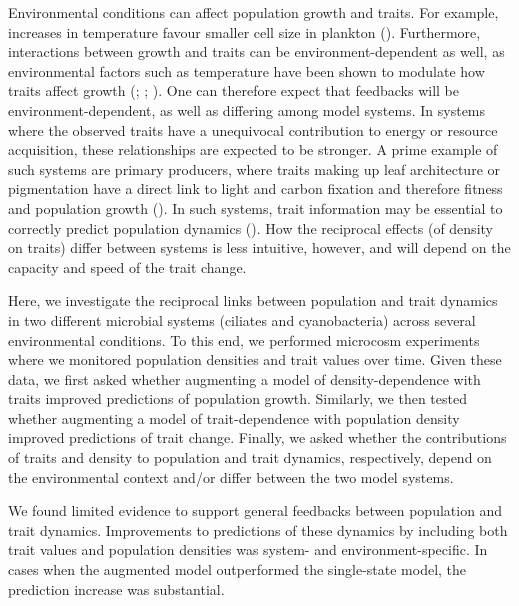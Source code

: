 \documentclass[
  letterpaper,
  DIV=11,
  numbers=noendperiod]{scrartcl}
\begin{document}
Environmental conditions can affect population growth and traits. For
example, increases in temperature favour smaller cell size in plankton
(). Furthermore, interactions between growth and traits can be
environment-dependent as well, as environmental factors such as
temperature have been shown to modulate how traits affect growth
(;
;
). One can
therefore expect that feedbacks will be environment-dependent, as well
as differing among model systems. In systems where the observed traits
have a unequivocal contribution to energy or resource acquisition, these
relationships are expected to be stronger. A prime example of such
systems are primary producers, where traits making up leaf architecture
or pigmentation have a direct link to light and carbon fixation and
therefore fitness and population growth (). In such systems, trait information may be essential to
correctly predict population dynamics (). How the reciprocal effects (of density on traits) differ
between systems is less intuitive, however, and will depend on the
capacity and speed of the trait change.

Here, we investigate the reciprocal links between population and trait
dynamics in two different microbial systems (ciliates and cyanobacteria)
across several environmental conditions. To this end, we performed
microcosm experiments where we monitored population densities and trait
values over time. Given these data, we first asked whether augmenting a
model of density-dependence with traits improved predictions of
population growth. Similarly, we then tested whether augmenting a model
of trait-dependence with population density improved predictions of
trait change. Finally, we asked whether the contributions of traits and
density to population and trait dynamics, respectively, depend on the
environmental context and/or differ between the two model systems.

We found limited evidence to support general feedbacks between
population and trait dynamics. Improvements to predictions of these
dynamics by including both trait values and population densities was
system- and environment-specific. In cases when the augmented model
outperformed the single-state model, the prediction increase was
substantial.
\end{document}
